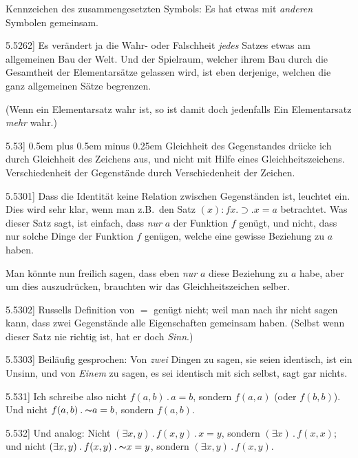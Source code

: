 \documentclass[12pt,oneside]{book}[2007/10/19]
\newcommand{\PropERef}[1]{\hyperref[PropE:#1]{#1}}
\newcommand{\PropositionG}[2]{%
  \item[\phantomsection\label{PropG:#1}\PropERef{#1}] #2%
}
\newcommand{\Not}[1]{\mathord{\thicksim} #1}
\newcommand{\DotOp}{\mathbin{.}}
\newcommand{\Implies}{\supset}
\newcommand{\Emph}[1]{\emph{#1}}%
\newcommand{\zumBeispiel}{z.\;B.}
\newcommand{\verystretchyspace}{\spaceskip0.5em plus 0.5em minus 0.25em}
\begin{document}
\begin{propositions}
{Kennzeichen des zusammengesetzten Symbols:
Es hat etwas mit \Emph{anderen} Symbolen gemeinsam.}


\PropositionG{5.5262}
{Es verändert ja die Wahr- oder Falschheit \Emph{jedes}
Satzes etwas am allgemeinen Bau der Welt. Und
der Spielraum, welcher ihrem Bau durch die
Gesamtheit der Elementarsätze gelassen wird, ist
eben derjenige, welchen die ganz allgemeinen
Sätze begrenzen.

(Wenn ein Elementarsatz wahr ist, so ist damit
doch jedenfalls Ein Elementarsatz \Emph{mehr} wahr.)}


\PropositionG{5.53}
{{\verystretchyspace
Gleichheit des Gegenstandes drücke ich durch
Gleichheit des Zeichens aus, und nicht mit Hilfe
eines Gleichheitszeichens. Verschiedenheit der
\enlargethispage{7pt} %
Gegenstände durch Verschiedenheit der Zeichen.}}


\PropositionG{5.5301}
{Dass die Identität keine Relation zwischen Gegenständen
ist, leuchtet ein. Dies wird sehr klar,
wenn man \zumBeispiel\ den Satz \glqq{}$(x) : fx \DotOp \Implies \DotOp x = a$\grqq{}
betrachtet. Was dieser Satz sagt, ist einfach,
dass \Emph{nur} $a$ der Funktion $f$ genügt, und nicht,
dass nur solche Dinge der Funktion $f$ genügen,
welche eine gewisse Beziehung zu $a$ haben.

Man könnte nun freilich sagen, dass eben \Emph{nur}
$a$ diese Beziehung zu $a$ habe, aber um dies auszudrücken,
brauchten wir das Gleichheitszeichen
selber.}


\PropositionG{5.5302}
{Russells Definition von \glqq{}$=$\grqq{} genügt nicht; weil
man nach ihr nicht sagen kann, dass zwei Gegenstände
alle Eigenschaften gemeinsam haben.
(Selbst wenn dieser Satz nie richtig ist, hat er
doch \Emph{Sinn}.)}


\PropositionG{5.5303}
{Beiläufig gesprochen: Von \Emph{zwei} Dingen zu
sagen, sie seien identisch, ist ein Unsinn, und von
\Emph{Einem} zu sagen, es sei identisch mit sich selbst,
sagt gar nichts.}


\PropositionG{5.531}
{Ich schreibe also nicht \glqq{}$f(a,b) \DotOp a = b$\grqq{}, sondern
\glqq{}$f(a,a)$\grqq{} (oder \glqq{}$f(b,b)$\grqq{}). Und nicht \glqq{}$f(a,b) \DotOp \Not{a = b}$\grqq{},
sondern \glqq{}$f(a,b)$\grqq{}.}


\PropositionG{5.532}
{Und analog: Nicht \glqq{}$(\exists x,y) \DotOp f(x,y) \DotOp x = y$\grqq{},
sondern \glqq{}$(\exists x) \DotOp f(x,x)$\grqq{}; und nicht \glqq{}$(\exists x,y) \DotOp f(x,y) \DotOp
\Not{x = y}$\grqq{}, sondern \glqq{}$(\exists x,y) \DotOp f(x,y)$\grqq{}.

}
\end{propositions}
\end{document}
